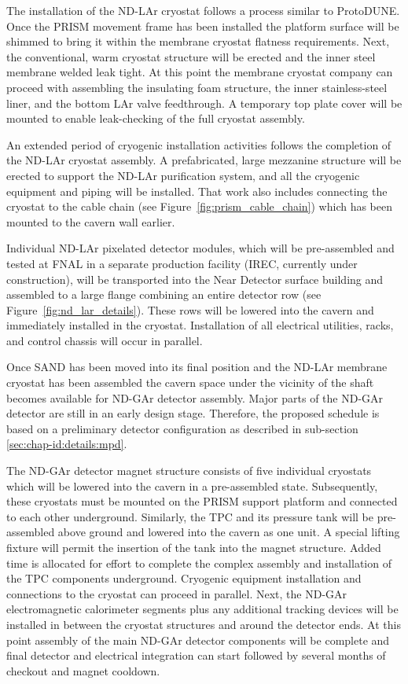The installation of the ND-LAr cryostat follows a process similar to ProtoDUNE. Once the PRISM movement frame has been installed the platform surface will be shimmed to bring it within the membrane cryostat flatness requirements. Next, the conventional, warm cryostat structure will be erected and the inner steel membrane welded leak tight. At this point the membrane cryostat company can proceed with assembling the insulating foam structure, the inner stainless-steel liner, and the bottom LAr valve feedthrough. A temporary top plate cover will be mounted to enable leak-checking of the full cryostat assembly.

An extended period of cryogenic installation activities follows the completion of the ND-LAr cryostat assembly. A prefabricated, large mezzanine structure will be erected to support the ND-LAr purification system, and all the cryogenic equipment and piping will be installed. That work also includes connecting the cryostat to the cable chain (see Figure~\ref{fig:prism_cable_chain}) which has been mounted to the cavern wall earlier.

Individual ND-LAr pixelated detector modules, which will be pre-assembled and tested at FNAL in a separate production facility (IREC, currently under construction), will be transported into the Near Detector surface building and assembled to a large flange combining an entire detector row (see Figure~\ref{fig:nd_lar_details}). These rows will be lowered into the cavern and immediately installed in the cryostat. Installation of all electrical utilities, racks, and control chassis will occur in parallel.

Once SAND has been moved into its final position and the ND-LAr membrane cryostat has been assembled the cavern space under the vicinity of the shaft becomes available for ND-GAr detector assembly. Major parts of the ND-GAr detector are still in an early design stage. Therefore, the proposed schedule is based on a preliminary detector configuration as described in sub-section \ref{sec:chap-id:details:mpd}.

The ND-GAr detector magnet structure consists of five individual cryostats which will be lowered into the cavern in a pre-assembled state. Subsequently, these cryostats must be mounted on the PRISM support platform and connected to each other underground. Similarly, the TPC and its pressure tank will be pre-assembled above ground and lowered into the cavern as one unit. A special lifting fixture will permit the insertion of the tank into the magnet structure. Added time is allocated for effort to complete the complex assembly and installation of the TPC components underground. Cryogenic equipment installation and connections to the cryostat can proceed in parallel. Next, the ND-GAr electromagnetic calorimeter segments plus any additional tracking devices will be installed in between the cryostat structures and around the detector ends. At this point assembly of the main ND-GAr detector components will be complete and final detector and electrical integration can start followed by several months of checkout and magnet cooldown.


